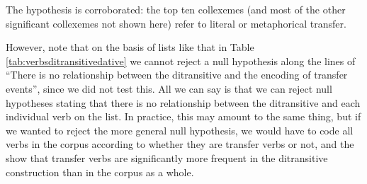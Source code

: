 \begin{table}[!htbp]
\caption{The verbs in the ditransitive construction (ICE-GB, \citet[229]{stefanowitsch_collostructions:_2003})}
\label{tab:verbsditransitive}
\end{table}

The hypothesis is corroborated: the top ten collexemes (and most of the other significant collexemes not shown here) refer to literal or metaphorical transfer.

However, note that on the basis of lists like that in Table \ref{tab:verbsditransitivedative} we cannot reject a null hypothesis along the lines of ``There is no relationship between the ditransitive and the encoding of transfer events'', since we did not test this. All we can say is that we can reject null hypotheses stating that there is no relationship between the ditransitive and each individual verb on the list. In practice, this may amount to the same thing, but if we wanted to reject the more general null hypothesis, we would have to code all verbs in the corpus according to whether they are transfer verbs or not, and the show that transfer verbs are significantly more frequent in the ditransitive construction than in the corpus as a whole.

